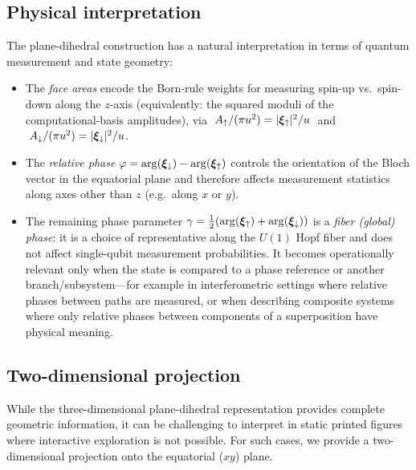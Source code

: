 \subsection{Physical interpretation}
\label{sec:disc_physics}

The plane-dihedral construction has a natural interpretation in terms of quantum measurement and state geometry:
\begin{itemize}
    \item The \emph{face areas} encode the Born-rule weights for measuring spin-up vs.\ spin-down along the $z$-axis (equivalently: the squared moduli of the computational-basis amplitudes), via
    $\;A_\uparrow/(\pi u^2)=|\bm{\xi}_\uparrow|^2/u\;$ and $\;A_\downarrow/(\pi u^2)=|\bm{\xi}_\downarrow|^2/u$.
    \item The \emph{relative phase} $\varphi=\arg(\bm{\xi}_\downarrow)-\arg(\bm{\xi}_\uparrow)$ controls the orientation of the Bloch vector in the equatorial plane and therefore affects measurement statistics along axes other than $z$ (e.g.\ along $x$ or $y$).
    \item The remaining phase parameter $\gamma=\tfrac12(\arg(\bm{\xi}_\uparrow)+\arg(\bm{\xi}_\downarrow))$ is a \emph{fiber (global) phase}: it is a choice of representative along the $U(1)$ Hopf fiber and does not affect single-qubit measurement probabilities.
    It becomes operationally relevant only when the state is compared to a phase reference or another branch/subsystem---for example in interferometric settings where relative phases between paths are measured, or when describing composite systems where only relative phases between components of a superposition have physical meaning.
\end{itemize}


\subsection{Two-dimensional projection}
\label{sec:disc_2d}

While the three-dimensional plane-dihedral representation provides complete geometric information, it can be challenging to interpret in static printed figures where interactive exploration is not possible. For such cases, we provide a two-dimensional projection onto the equatorial ($xy$) plane.

